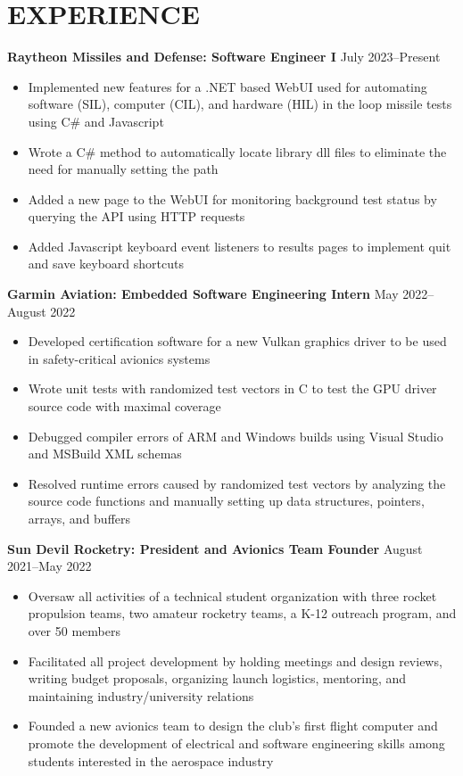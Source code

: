 \documentclass{article}
\begin{document}
\section{EXPERIENCE}
\textbf{Raytheon Missiles and Defense: Software Engineer I}
\hfill
\vspace{0.5em}
July 2023--Present
\begin{itemize}
\item{Implemented new features for a .NET based WebUI used for automating software (SIL), computer (CIL), and hardware (HIL) in the loop missile tests using C\# and Javascript}
\item{Wrote a C\# method to automatically locate library dll files to eliminate the need for manually setting the path}
\item{Added a new page to the WebUI for monitoring background test status by querying the API using HTTP requests}
\item{Added Javascript keyboard event listeners to results pages to implement quit and save keyboard shortcuts}
\end{itemize}
\vspace{1em}
\textbf{Garmin Aviation: Embedded Software Engineering Intern}
\hfill
\vspace{0.5em}
May 2022--August 2022
\begin{itemize}
\item{Developed certification software for a new Vulkan graphics driver to be used in safety-critical avionics systems}
\item{Wrote unit tests with randomized test vectors in C to test the GPU driver source code with maximal coverage}
\item{Debugged compiler errors of ARM and Windows builds using Visual Studio and MSBuild XML schemas}
\item{Resolved runtime errors caused by randomized test vectors by analyzing the source code functions and manually setting up data structures, pointers, arrays, and buffers}
\end{itemize}
\vspace{1em}
\textbf{Sun Devil Rocketry: President and Avionics Team Founder}
\hfill
\vspace{0.5em}
August 2021--May 2022
\begin{itemize}
\item{Oversaw all activities of a technical student organization with three rocket propulsion teams, two amateur rocketry teams, a K-12 outreach program, and over 50 members   }
\item{Facilitated all project development by holding meetings and design reviews, writing budget proposals, organizing launch logistics, mentoring, and maintaining industry/university relations}
\item{Founded a new avionics team to design the club's first flight computer and promote the development of electrical and software engineering skills among students interested in the aerospace industry}
\end{itemize}
\end{document}
